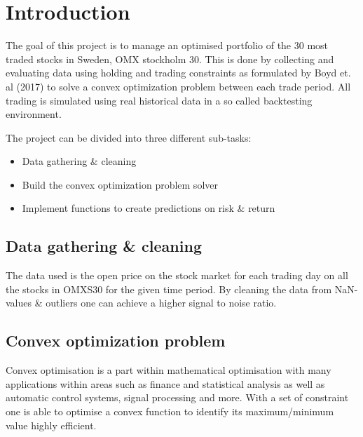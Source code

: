 \documentclass{LTHtwocol} %
\begin{document}
\section{Introduction}
The goal of this project is to manage an optimised portfolio of the 30 most traded stocks in Sweden, OMX stockholm 30. This is done by collecting and evaluating data using holding and trading constraints as formulated by Boyd et. al (2017) to solve a convex optimization problem between each trade period\cite{Boyd}. All trading is simulated using real historical data in a so called backtesting environment. 

The project can be divided into three different sub-tasks:
\begin{itemize}
\item Data gathering \& cleaning
\item Build the convex optimization problem solver
\item Implement functions to create predictions on risk \& return
\end{itemize}

 




\subsection{Data gathering \& cleaning}
The data used is the open price on the stock market for each trading day on all the stocks in OMXS30 for the given time period. By cleaning the data from NaN-values \& outliers one can achieve a higher signal to noise ratio. 

\subsection{Convex optimization problem}
Convex optimisation is a part within mathematical optimisation with many applications within areas such as finance and statistical analysis as well as automatic control systems, signal processing and more. With a set of constraint one is able to optimise a convex function to identify its maximum/minimum value highly efficient.\cite{Boyd}
\end{document}
